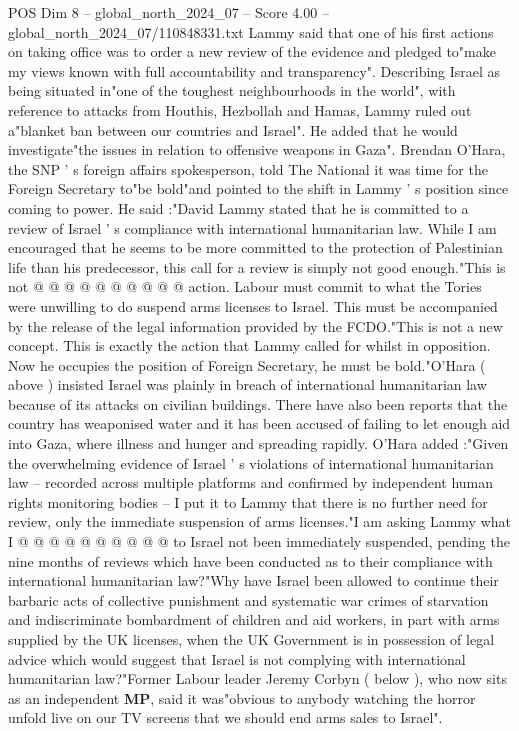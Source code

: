 \begin{textsample}{POS Dim 8 – global\_north\_2024\_07 – Score 4.00 – global\_north\_2024\_07/110848331.txt}  \label{ex:f8_pos_269}
Lammy said that one of his first actions on taking office was to order a new review of the evidence and pledged to"make my views known with full accountability and transparency".
Describing Israel as being situated in"one of the toughest neighbourhoods in the world", with reference to attacks from Houthis, Hezbollah and Hamas, Lammy ruled out a"blanket ban between our countries and Israel".
He added that he would investigate"the issues in relation to offensive weapons in Gaza".
Brendan O'Hara, the SNP ' s foreign affairs spokesperson, told The National it was time for the Foreign Secretary to"be bold"and pointed to the shift in Lammy ' s position since coming to power.
He said :"David Lammy stated that he is committed to a review of Israel ' s compliance with international humanitarian law.
While I am encouraged that he seems to be more committed to the protection of Palestinian life than his predecessor, this call for a review is simply not good enough."This is not @ @ @ @ @ @ @ @ @ @ action.
Labour must commit to what the Tories were unwilling to do suspend arms licenses to Israel.
This must be accompanied by the release of the legal information provided by the FCDO."This is not a new concept.
This is exactly the action that Lammy called for whilst in opposition.
Now he occupies the position of Foreign Secretary, he must be bold."O'Hara ( above ) insisted Israel was plainly in breach of international humanitarian law because of its attacks on civilian buildings.
There have also been reports that the country has weaponised water and it has been accused of failing to let enough aid into Gaza, where illness and hunger and spreading rapidly.
O'Hara added :"Given the overwhelming evidence of Israel ' s violations of international humanitarian law -- recorded across multiple platforms and confirmed by independent human rights monitoring bodies -- I put it to Lammy that there is no further need for review, only the immediate suspension of arms licenses."I am asking Lammy what I @ @ @ @ @ @ @ @ @ @ to Israel not been immediately suspended, pending the nine months of reviews which have been conducted as to their compliance with international humanitarian law?"Why have Israel been allowed to continue their barbaric acts of collective punishment and systematic war crimes of starvation and indiscriminate bombardment of children and aid workers, in part with arms supplied by the UK licenses, when the UK Government is in possession of legal advice which would suggest that Israel is not complying with international humanitarian law?"Former Labour leader Jeremy Corbyn ( below ), who now sits as an independent \textbf{MP}, said it was"obvious to anybody watching the horror unfold live on our TV screens that we should end arms sales to Israel".

\end{textsample}

